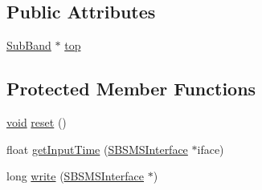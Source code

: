 \subsection*{Public Attributes}
\begin{DoxyCompactItemize}
\item 
\hyperlink{class__sbsms___1_1_sub_band}{Sub\+Band} $\ast$ \hyperlink{class__sbsms___1_1_s_b_s_m_s_imp_a190bb3fc4e584e5db761ff93f7885137}{top}
\end{DoxyCompactItemize}
\subsection*{Protected Member Functions}
\begin{DoxyCompactItemize}
\item 
\hyperlink{sound_8c_ae35f5844602719cf66324f4de2a658b3}{void} \hyperlink{class__sbsms___1_1_s_b_s_m_s_imp_aff93ad637e880277613bf69623a75d42}{reset} ()
\item 
float \hyperlink{class__sbsms___1_1_s_b_s_m_s_imp_a0fc43144f8f510e7a58a678ca8bf44dc}{get\+Input\+Time} (\hyperlink{class__sbsms___1_1_s_b_s_m_s_interface}{S\+B\+S\+M\+S\+Interface} $\ast$iface)
\item 
long \hyperlink{class__sbsms___1_1_s_b_s_m_s_imp_a2e81a1e809639b717638821eae41b534}{write} (\hyperlink{class__sbsms___1_1_s_b_s_m_s_interface}{S\+B\+S\+M\+S\+Interface} $\ast$)
\end{DoxyCompactItemize}
